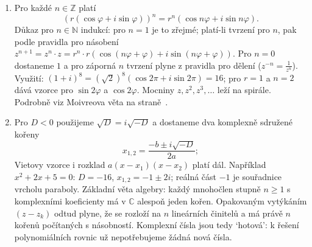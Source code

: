 \begin{enumerate}[label=\textbf{\arabic*.}, leftmargin=*, itemsep=0.8em]
  \item {}
  Pro každé $n\in\mathbb{Z}$ platí
  \begin{equation*}
    {\left(r(\cos\varphi + i\sin\varphi)\right)}^n = r^n(\cos n\varphi + i\sin n\varphi).
  \end{equation*}
  Důkaz pro $n\in\mathbb{N}$ indukcí: pro $n = 1$ je to zřejmé; platí-li tvrzení pro $n$, pak podle pravidla pro násobení $z^{n+1} = z^n\cdot z = r^n\cdot r\left(\cos(n\varphi + \varphi) + i\sin(n\varphi + \varphi)\right)$. Pro $n = 0$ dostaneme $1$ a pro záporná $n$ tvrzení plyne z pravidla pro dělení ($z^{-n} = \frac{1}{z^n}$). Využití: ${(1 + i)}^8 = {(\sqrt{2})}^8(\cos 2\pi + i\sin 2\pi) = 16$; pro $r = 1$ a $n = 2$ dává vzorce pro $\sin 2\varphi$ a $\cos 2\varphi$. Mocniny $z, z^2, z^3, \ldots$ leží na spirále. Podrobně viz Moivreova věta na straně~\pageref{def:moivre}.

  \item {}
  Pro $D < 0$ použijeme $\sqrt{D} = i\sqrt{-D}$ a dostaneme dva komplexně sdružené kořeny
  \begin{equation*}
    x_{1,2} = \frac{-b\pm i\sqrt{-D}}{2a};
  \end{equation*}
  Vietovy vzorce i rozklad $a(x - x_1)(x - x_2)$ platí dál. Například $x^2 + 2x + 5 = 0$: $D = -16$, $x_{1,2} = -1\pm 2i$; reálná část $-1$ je souřadnice vrcholu paraboly. Základní věta algebry: každý mnohočlen stupně $n\geq 1$ s komplexními koeficienty má v $\mathbb{C}$ alespoň jeden kořen. Opakovaným vytýkáním $(z - z_k)$ odtud plyne, že se rozloží na $n$ lineárních činitelů a má právě $n$ kořenů počítaných s násobností. Komplexní čísla jsou tedy `hotová': k řešení polynomiálních rovnic už nepotřebujeme žádná nová čísla. 


\end{enumerate}
